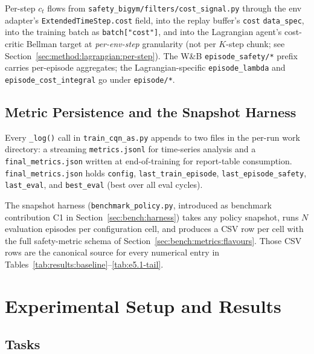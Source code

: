 \documentclass[11pt,a4paper]{report}
\begin{document}
Per-step $c_t$ flows from
\texttt{safety\_bigym/filters/cost\_signal.py} through the env
adapter's \texttt{ExtendedTimeStep.cost} field, into the replay
buffer's \texttt{cost} \texttt{data\_spec}, into the training batch
as \texttt{batch["cost"]}, and into the Lagrangian agent's
cost-critic Bellman target at \emph{per-env-step} granularity (not
per $K$-step chunk; see Section~\ref{sec:method:lagrangian:per-step}).
The W\&B \texttt{episode\_safety/*} prefix carries per-episode
aggregates; the Lagrangian-specific \texttt{episode\_lambda} and
\texttt{episode\_cost\_integral} go under \texttt{episode/*}.

\section{Metric Persistence and the Snapshot Harness}
\label{sec:impl:metrics}

Every \texttt{\_log()} call in \texttt{train\_cqn\_as.py} appends
to two files in the per-run work directory: a streaming
\texttt{metrics.jsonl} for time-series analysis and a
\texttt{final\_metrics.json} written at end-of-training for
report-table consumption. \texttt{final\_metrics.json} holds
\texttt{config}, \texttt{last\_train\_episode},
\texttt{last\_episode\_safety}, \texttt{last\_eval}, and
\texttt{best\_eval} (best over all eval cycles).

The snapshot harness (\texttt{benchmark\_policy.py}, introduced as
benchmark contribution C1 in Section~\ref{sec:bench:harness})
takes any policy snapshot, runs $N$ evaluation episodes per
configuration cell, and produces a CSV row per cell with the full
safety-metric schema of Section~\ref{sec:bench:metrics:flavours}.
Those CSV rows are the canonical source for every numerical entry in
Tables~\ref{tab:results:baseline}--\ref{tab:e5.1-tail}.

\chapter{Experimental Setup and Results}
\label{ch:eval}

\section{Tasks}
\label{sec:setup:tasks}
\end{document}
